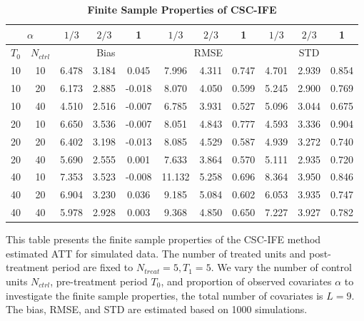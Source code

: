 \documentclass[12pt]{article}
\begin{document}
\begin{table}[!ht]
    \centering
    \caption{\textbf{Finite Sample Properties of CSC-IFE}}
    \begin{tabular}{cc|ccc|ccc|ccc}
    \toprule
    \multicolumn{2}{c|}{$\alpha$} & $1/3$ & $2/3$ & 1 & $1/3$ & $2/3$ & 1 & $1/3$ & $2/3$ & 1 \\
    \hline
    $T_0$ & $N_{ctrl}$ & \multicolumn{3}{c|}{Bias} & \multicolumn{3}{c|}{RMSE}  & \multicolumn{3}{c}{STD} \\
    \hline
    10 & 10 & 6.478 & 3.184 & 0.045 & 7.996 & 4.311 & 0.747 & 4.701 & 2.939 & 0.854 \\
    10 & 20 & 6.173 & 2.885 & -0.018 & 8.070 & 4.050 & 0.599 & 5.245 & 2.900 & 0.769 \\
    10 & 40 & 4.510 & 2.516 & -0.007 & 6.785 & 3.931 & 0.527 & 5.096 & 3.044 & 0.675 \\
\cline{1-11}
    20 & 10 & 6.650 & 3.536 & -0.007 & 8.051 & 4.843 & 0.777 & 4.593 & 3.336 & 0.904 \\
    20 & 20 & 6.402 & 3.198 & -0.013 & 8.085 & 4.529 & 0.587 & 4.939 & 3.272 & 0.740 \\
    20 & 40 & 5.690 & 2.555 & 0.001 & 7.633 & 3.864 & 0.570 & 5.111 & 2.935 & 0.720 \\
\cline{1-11}
    40 & 10 & 7.353 & 3.523 & -0.008 & 11.132 & 5.258 & 0.696 & 8.364 & 3.950 & 0.846 \\
    40 & 20 & 6.904 & 3.230 & 0.036 & 9.185 & 5.084 & 0.602 & 6.053 & 3.935 & 0.747 \\
    40 & 40 & 5.978 & 2.928 & 0.003 & 9.368 & 4.850 & 0.650 & 7.227 & 3.927 & 0.782 \\
    \bottomrule
    \end{tabular}
    \begin{tablenotes}
        \item This table presents the finite sample properties of the CSC-IFE method estimated ATT for simulated data. The number of treated units and post-treatment period are fixed to $N_{treat} = 5, T_1=5$. We vary the number of control units $N_{ctrl}$, pre-treatment period $T_0$, and proportion of observed covariates $\alpha$ to investigate the finite sample properties, the total number of covariates is $L=9$. The bias, RMSE, and STD are estimated based on 1000 simulations.
    \end{tablenotes}
    \end{table}
\end{document}
